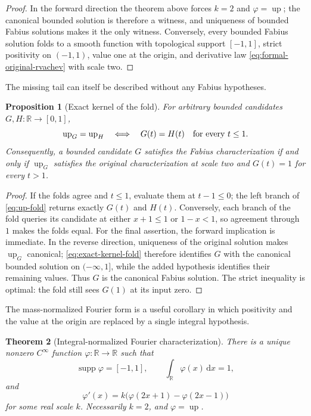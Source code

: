 \documentclass[11pt,oneside]{article}
\newtheorem{theorem}{Theorem}[section]
\newtheorem{proposition}[theorem]{Proposition}
\theoremstyle{definition}
\theoremstyle{remark}
\newcommand{\R}{\mathbb R}
\newcommand{\Up}{\operatorname{up}}
\newcommand{\dd}{\,\mathrm d}
\newcommand{\supp}{\operatorname{supp}}
\begin{document}
\begin{proof}
In the forward direction the theorem above forces $k=2$ and $\varphi=\Up$; the canonical
bounded solution is therefore a witness, and uniqueness of bounded Fabius solutions makes
it the only witness.  Conversely, every bounded Fabius solution folds to a smooth function
with topological support $[-1,1]$, strict positivity on $(-1,1)$, value one at the origin,
and derivative law \eqref{eq:formal-original-rvachev} with scale two.
\end{proof}

The missing tail can itself be described without any Fabius hypotheses.

\begin{proposition}[Exact kernel of the fold]
\label{prop:exact-kernel-fold}
For arbitrary bounded candidates $G,H:\R\to[0,1]$,
\begin{equation}
 \Up_G=\Up_H
 \quad\Longleftrightarrow\quad
 G(t)=H(t)\quad\hbox{for every }t\le1.                 \label{eq:exact-kernel-fold}
\end{equation}
Consequently, a bounded candidate $G$ satisfies the Fabius characterization if and only if
$\Up_G$ satisfies the original characterization at scale two and
$G(t)=1$ for every $t>1$.
\end{proposition}

\begin{proof}
If the folds agree and $t\le1$, evaluate them at $t-1\le0$; the left branch of
\eqref{eq:up-fold} returns exactly $G(t)$ and $H(t)$.  Conversely, each branch of the fold
queries its candidate at either $x+1\le1$ or $1-x<1$, so agreement through $1$ makes the
folds equal.  For the final assertion, the forward implication is immediate.  In the
reverse direction, uniqueness of the original solution makes $\Up_G$ canonical;
\eqref{eq:exact-kernel-fold} therefore identifies $G$ with the canonical bounded solution
on $(-\infty,1]$, while the added hypothesis identifies their remaining values.  Thus $G$
is the canonical Fabius solution.  The strict inequality is optimal: the fold still sees
$G(1)$ at its input zero.
\end{proof}

The mass-normalized Fourier form is a useful corollary in which positivity and the value at
the origin are replaced by a single integral hypothesis.

\begin{theorem}[Integral-normalized Fourier characterization]
There is a unique nonzero $C^\infty$ function $\varphi:\R\to\R$ such that
\begin{equation}
 \supp\varphi=[-1,1],\qquad
 \int_\R\varphi(x)\dd x=1,                                \label{eq:original-normalization}
\end{equation}
and
\begin{equation}
 \varphi'(x)=k\bigl(\varphi(2x+1)-\varphi(2x-1)\bigr)       \label{eq:original-rvachev}
\end{equation}
for some real scale $k$.  Necessarily $k=2$, and $\varphi=\Up$.
\end{theorem}
\end{document}

